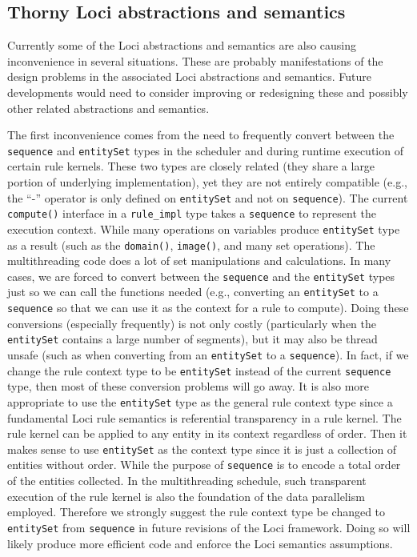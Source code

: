 \documentclass{article}
\begin{document}
\subsection{Thorny Loci abstractions and semantics}
\label{sec:thornyabs}
Currently some of the Loci abstractions and semantics are also causing
inconvenience in several situations.  These are probably manifestations
of the design problems in the associated Loci abstractions and
semantics.  Future developments would need to consider improving or
redesigning these and possibly other related abstractions and semantics.

The first inconvenience comes from the need to frequently convert
between the \lstinline{sequence} and \lstinline{entitySet} types in the
scheduler and during runtime execution of certain rule kernels.  These
two types are closely related (they share a large portion of underlying
implementation), yet they are not entirely compatible (e.g., the ``-''
operator is only defined on \lstinline{entitySet} and not on
\lstinline{sequence}).  The current \lstinline{compute()} interface in a
\lstinline{rule_impl} type takes a \lstinline{sequence} to represent the
execution context.  While many operations on variables produce
\lstinline{entitySet} type as a result (such as the
\lstinline{domain()}, \lstinline{image()}, and many set operations).
The multithreading code does a lot of set manipulations and
calculations.  In many cases, we are forced to convert between the
\lstinline{sequence} and the \lstinline{entitySet} types just so we can
call the functions needed (e.g., converting an \lstinline{entitySet} to
a \lstinline{sequence} so that we can use it as the context for a rule
to compute).  Doing these conversions (especially frequently) is not
only costly (particularly when the \lstinline{entitySet} contains a
large number of segments), but it may also be thread unsafe (such as
when converting from an \lstinline{entitySet} to a
\lstinline{sequence}).  In fact, if we change the rule context type to
be \lstinline{entitySet} instead of the current \lstinline{sequence}
type, then most of these conversion problems will go away.  It is also
more appropriate to use the \lstinline{entitySet} type as the general
rule context type since a fundamental Loci rule semantics is referential
transparency in a rule kernel.  The rule kernel can be applied to any
entity in its context regardless of order.  Then it makes sense to use
\lstinline{entitySet} as the context type since it is just a collection
of entities without order.  While the purpose of \lstinline{sequence} is
to encode a total order of the entities collected.  In the
multithreading schedule, such transparent execution of the rule kernel
is also the foundation of the data parallelism employed.  Therefore we
strongly suggest the rule context type be changed to
\lstinline{entitySet} from \lstinline{sequence} in future revisions of
the Loci framework.  Doing so will likely produce more efficient code
and enforce the Loci semantics assumptions.
\end{document}
